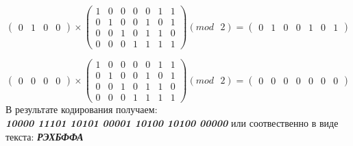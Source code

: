 \documentclass[a5paper, 10pt]{article}
\theoremstyle{definition}
\theoremstyle{plain}
\theoremstyle{remark}
\begin{document}
\begin{equation}
\begin{pmatrix}
0 & 1 & 0 & 0
\end{pmatrix}
 \times
\begin{pmatrix}
1 & 0 & 0 & 0 & 0 & 1 & 1\\
0 & 1 & 0 & 0 & 1 & 0 & 1\\
0 & 0 & 1 & 0 & 1 & 1 & 0\\
0 & 0 & 0 & 1 & 1 & 1 & 1
\end{pmatrix}
(mod \text{ }2)
= \begin{pmatrix}
0 & 1 & 0 & 0 & 1 & 0 & 1
\end{pmatrix}
\end{equation}

\begin{equation}
\begin{pmatrix}
0 & 0 & 0 & 0
\end{pmatrix}
 \times
\begin{pmatrix}
1 & 0 & 0 & 0 & 0 & 1 & 1\\
0 & 1 & 0 & 0 & 1 & 0 & 1\\
0 & 0 & 1 & 0 & 1 & 1 & 0\\
0 & 0 & 0 & 1 & 1 & 1 & 1
\end{pmatrix}
(mod \text{ }2)
= \begin{pmatrix}
0 & 0 & 0 & 0 & 0 & 0 & 0
\end{pmatrix}
\end{equation}
В результате кодирования получаем:\\
 \textbf{\textit{10000 11101 10101 00001 10100 10100 00000}} или соотвественно в виде текста:  \textbf{\textit{РЭХБФФА}}
\end{document}
